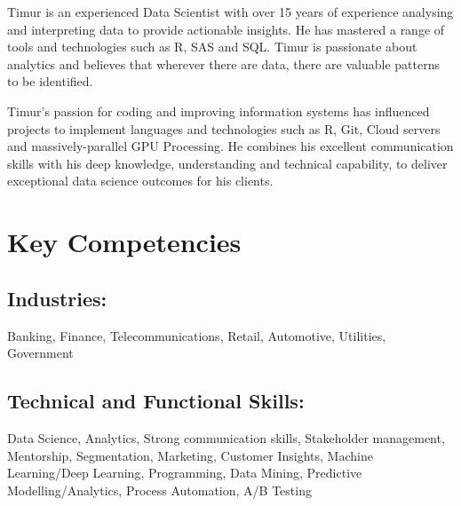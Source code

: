 \documentclass{article}
\begin{document}

\pagestyle{fancy}
\fancyhf{} %


Timur is an experienced Data Scientist with over 15 years of experience analysing and interpreting data to provide actionable insights. He has mastered a range of tools and technologies such as R, SAS and SQL. Timur is passionate about analytics and believes that wherever there are data, there are valuable patterns to be identified.

Timur's passion for coding and improving information systems has influenced projects to implement languages and technologies such as R, Git, Cloud servers and massively-parallel GPU
Processing. He combines his excellent communication skills with his deep knowledge, understanding and technical capability, to deliver exceptional data science outcomes for his clients.

\section{Key Competencies}
\subsection{Industries:}
Banking, Finance, Telecommunications, Retail, Automotive, Utilities, Government

\subsection{Technical and Functional Skills:}
Data Science, Analytics, Strong communication skills, Stakeholder management, Mentorship, Segmentation, Marketing, Customer Insights, Machine Learning/Deep Learning, Programming, Data Mining, Predictive Modelling/Analytics, Process Automation, A/B Testing
\end{document}
